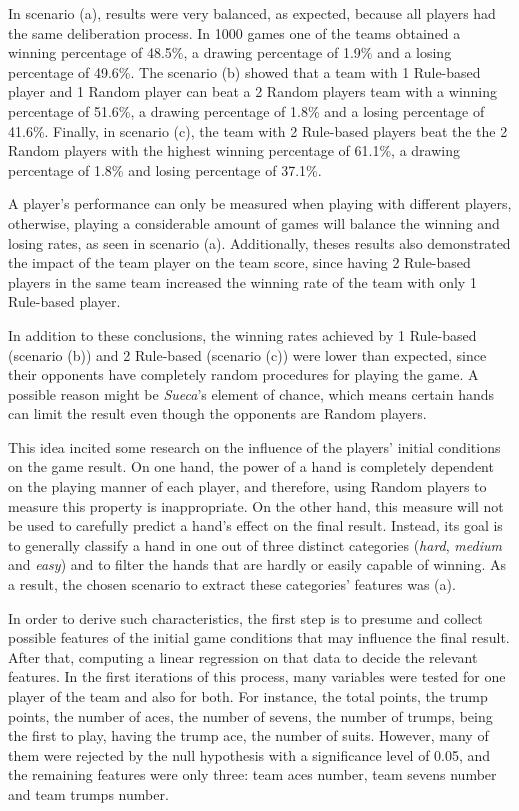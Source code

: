 In scenario (a), results were very balanced, as expected, because all players had the same deliberation process.
In 1000 games one of the teams obtained a winning percentage of 48.5\%, a drawing percentage of 1.9\% and a losing percentage of 49.6\%.
The scenario (b) showed that a team with 1 Rule-based player and 1 Random player can beat a 2 Random players team with a winning percentage of 51.6\%, a drawing percentage of 1.8\% and a losing percentage of 41.6\%.
Finally, in scenario (c), the team with 2 Rule-based players beat the the 2 Random players with the highest winning percentage of 61.1\%, a drawing percentage of 1.8\% and losing percentage of 37.1\%.

A player's performance can only be measured when playing with different players, otherwise, playing a considerable amount of games will balance the winning and losing rates, as seen in scenario (a).
Additionally, theses results also demonstrated the impact of the team player on the team score, since having 2 Rule-based players in the same team increased the winning rate of the team with only 1 Rule-based player.

In addition to these conclusions, the winning rates achieved by 1 Rule-based (scenario (b)) and 2 Rule-based (scenario (c)) were lower than expected, since their opponents have completely random procedures for playing the game.
A possible reason might be \emph{Sueca}'s element of chance, which means certain hands can limit the result even though the opponents are Random players.

This idea incited some research on the influence of the players' initial conditions on the game result.
On one hand, the power of a hand is completely dependent on the playing manner of each player, and therefore, using Random players to measure this property is inappropriate.
On the other hand, this measure will not be used to carefully predict a hand's effect on the final result.
Instead, its goal is to generally classify a hand in one out of three distinct categories (\emph{hard}, \emph{medium} and \emph{easy}) and to filter the hands that are hardly or easily capable of winning.
As a result, the chosen scenario to extract these categories' features was (a).

In order to derive such characteristics, the first step is to presume and collect possible features of the initial game conditions that may influence the final result.
After that, computing a linear regression on that data to decide the relevant features.
In the first iterations of this process, many variables were tested for one player of the team and also for both.
For instance, the total points, the trump points, the number of aces, the number of sevens, the number of trumps, being the first to play, having the trump ace, the number of suits.
However, many of them were rejected by the null hypothesis with a significance level of 0.05, and the remaining features were only three: team aces number, team sevens number and team trumps number.

